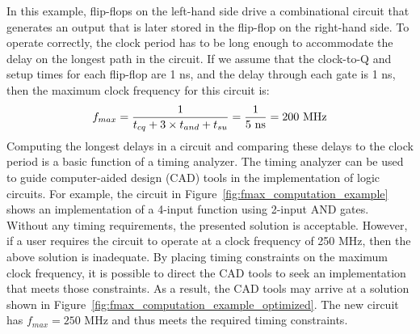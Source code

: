\documentclass[11pt, twoside, pdftex]{article}
\begin{document}
\noindent
In this example, flip-flops on the left-hand side drive a combinational circuit that 
generates an output that is later stored in the flip-flop on the right-hand side. To 
operate correctly, the clock period has to be long enough to accommodate the delay on the 
longest path in the circuit. If we assume that the clock-to-Q and setup times for each 
flip-flop are 1 ns, and the delay through each gate is 1 ns, then the maximum clock frequency 
for this circuit is:
$$
f_{max} = \frac{1}{t_{cq}+3 \times t_{and}+t_{su}} = \frac{1}{5 {\rm ~ns}} = 200 {\rm ~MHz}
$$
Computing the longest delays in a circuit and comparing these delays to the clock period 
is a basic function of a timing analyzer. The timing analyzer can be used to guide 
computer-aided design (CAD) tools in the implementation of logic circuits. For example, the 
circuit in Figure~\ref{fig:fmax_computation_example} shows an implementation
of a 4-input function using 2-input AND gates. Without any timing requirements, the presented solution is acceptable. However, if a user
requires the circuit to operate at a clock frequency of 250 MHz, then 
the above solution is inadequate. By placing timing constraints on the
maximum clock frequency, it is possible to direct the CAD tools to seek an implementation
that meets those constraints. As a result,
the CAD tools may arrive at a solution shown in Figure~\ref{fig:fmax_computation_example_optimized}. The new circuit has
$f_{max} = 250$ MHz and thus meets the required timing constraints.
\end{document}
